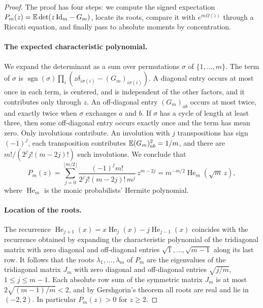 \begin{proof}
The proof has four steps: we compute the signed expectation $P_m(z)=\mathbb E\det(z\,\mathrm{Id}_m-G_m)$, locate its roots, compare it with $e^{m\Omega(z)}$ through a Riccati equation, and finally pass to absolute moments by concentration.

\paragraph{The expected characteristic polynomial.}
We expand the determinant as a sum over permutations $\sigma$ of $\{1,\dots,m\}$. The term of $\sigma$ is $\operatorname{sgn}(\sigma)\prod_i(z\delta_{i\sigma(i)}-(G_m)_{i\sigma(i)})$. A diagonal entry occurs at most once in each term, is centered, and is independent of the other factors, and it contributes only through $z$. An off-diagonal entry $(G_m)_{ab}$ occurs at most twice, and exactly twice when $\sigma$ exchanges $a$ and $b$. If $\sigma$ has a cycle of length at least three, then some off-diagonal entry occurs exactly once and the term has mean zero. Only involutions contribute. An involution with $j$ transpositions has sign $(-1)^j$, each transposition contributes $\mathbb E(G_m)_{ab}^2=1/m$, and there are $m!/(2^jj!(m-2j)!)$ such involutions. We conclude that
\begin{equation}\label{eq:kr-hermite}
P_m(z)=\sum_{j=0}^{\lfloor m/2\rfloor}\frac{(-1)^jm!}{2^jj!(m-2j)!\,m^j}\,z^{m-2j}=m^{-m/2}\operatorname{He}_m(\sqrt m\,z),
\end{equation}
where $\operatorname{He}_m$ is the monic probabilists' Hermite polynomial.

\paragraph{Location of the roots.}
The recurrence $\operatorname{He}_{j+1}(x)=x\operatorname{He}_j(x)-j\operatorname{He}_{j-1}(x)$ coincides with the recurrence obtained by expanding the characteristic polynomial of the tridiagonal matrix with zero diagonal and off-diagonal entries $\sqrt1,\dots,\sqrt{m-1}$ along its last row. It follows that the roots $\lambda_1,\dots,\lambda_m$ of $P_m$ are the eigenvalues of the tridiagonal matrix $J_m$ with zero diagonal and off-diagonal entries $\sqrt{j/m}$, $1\le j\le m-1$. Each absolute row sum of the symmetric matrix $J_m$ is at most $2\sqrt{(m-1)/m}<2$, and by Gershgorin's theorem all roots are real and lie in $(-2,2)$. In particular $P_m(z)>0$ for $z\ge2$.


\end{proof}
